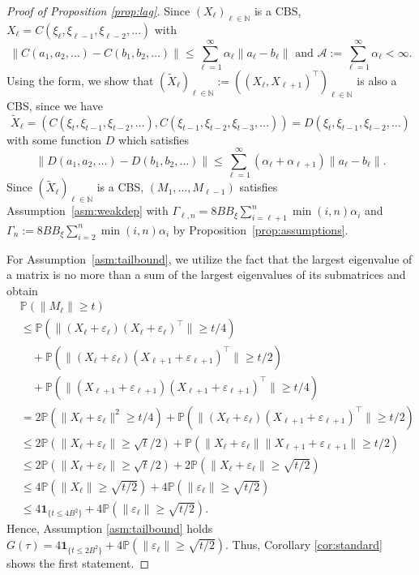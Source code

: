 \documentclass[11pt,a4paper]{article}
\theoremstyle{remark}
\theoremstyle{definition}
\renewcommand{\Pr}{\mathbb{P}}
\theoremstyle{definition}
\renewcommand{\Pr}{\mathbb{P}}
\renewcommand{\tilde}{\widetilde}
\newcommand{\rc}{\color{black}}
\begin{document}
\begin{bibunit}[apalike]
\begin{proof}[Proof of Proposition \ref{prop:lag}]
Since $(X_\ell)_{\ell \in \mathbb{N}}$ is a CBS, {\rc $X_\ell = C(\xi_{\ell},\xi_{\ell-1},\xi_{\ell-2},\dots) $} with
$$ \| C(a_1,a_2,\dots) - C(b_1,b_2,\dots) \| \leq \sum_{\ell=1}^{\infty} \alpha_\ell \|a_\ell-b_\ell \| \text{ and } \mathcal{A} := \sum_{\ell=1}^\infty \alpha_\ell < \infty. $$
Using the form, we show that $ (\tilde{X}_\ell)_{\ell \in \mathbb{N}} := ((X_\ell, X_{\ell + 1})^\top )_{\ell \in \mathbb{N}}$ is also a CBS, since we have
$$ \tilde{X}_\ell = (C(\xi_{t},\xi_{t-1},\xi_{t-2},\dots),C(\xi_{t-1},\xi_{t-2},\xi_{t-3},\dots)) = D(\xi_t,\xi_{t-1},\xi_{t-2},\dots) $$
with some function $D$ which satisfies
$$ \| D(a_1,a_2,\dots) - D(b_1,b_2,\dots) \| \leq \sum_{\ell=1}^{\infty} (\alpha_\ell + \alpha_{\ell+1}) \|a_\ell-b_\ell \| .$$
Since $(\tilde{X}_\ell)_{\ell \in \mathbb{N}} $ is a CBS, $(M_1,\ldots,M_{\ell - 1})$ satisfies Assumption~\ref{asm:weakdep} with $\Gamma_{\ell,n} = 8 B B_\xi \sum_{i=\ell+1}^n \min(i,n) \alpha_i  $ and $\Gamma_n :=  8 B B_\xi \sum_{i=2}^n \min(i,n) \alpha_i  $ by Proposition~\ref{prop:assumptions}.

For Assumption~\ref{asm:tailbound}, we utilize the fact that the largest eigenvalue of a matrix is no more than a sum of the largest eigenvalues of its submatrices and obtain
\begin{align*}
&\mathbb{P}(\|M_\ell\| \geq t ) \\
&\leq \mathbb{P}(\|(X_\ell+\varepsilon_{\ell})(X_{\ell}+\varepsilon_{\ell})^\top \| \geq t /4) \\
& \quad + \Pr( \|(X_\ell+\varepsilon_{\ell})(X_{\ell+1}+\varepsilon_{\ell+1})^\top \| \geq t /2 ) \\
& \quad  +  \Pr (\|(X_{\ell + 1}+\varepsilon_{\ell + 1})(X_{\ell + 1}+\varepsilon_{\ell + 1})^\top \|\geq t /4 )
\\
& = 2 \mathbb{P}(\|X_\ell+\varepsilon_{\ell} \|^2   \geq t/4 ) +  \Pr( \|(X_\ell+\varepsilon_{\ell})(X_{\ell+1}+\varepsilon_{\ell+1})^\top \| \geq t /2 )
\\
& \leq  2 \mathbb{P}(\|X_\ell+\varepsilon_{\ell} \|  \geq \sqrt{t} / 2 ) + \Pr( \|X_\ell+\varepsilon_{\ell} \| \|X_{\ell+1}+\varepsilon_{\ell+1} \| \geq t /2 )
\\
& \leq  2 \mathbb{P}(\|X_\ell+\varepsilon_{\ell} \|  \geq \sqrt{t} / 2 ) + 2\Pr( \|X_\ell+\varepsilon_{\ell} \|  \geq \sqrt{t /2} )
\\
&
\leq 4 \mathbb{P}(\|X_\ell\| \geq \sqrt{t/2} ) + 4 \mathbb{P}(\|\varepsilon_\ell\| \geq \sqrt{t/2} )
\\
& \leq 4 \mathbf{1}_{\{t\leq 4B^2\}} + 4 \mathbb{P}(\|\varepsilon_\ell\| \geq \sqrt{t/2} ).
\end{align*}
Hence, Assumption \ref{asm:tailbound} holds $G(\tau)=4 \mathbf{1}_{\{t\leq 2B^2\}} + 4 \mathbb{P}(\|\varepsilon_\ell\| \geq \sqrt{t/2} )$.
Thus, Corollary \ref{cor:standard} shows the first statement.



\end{proof}
\end{bibunit}
\end{document}
